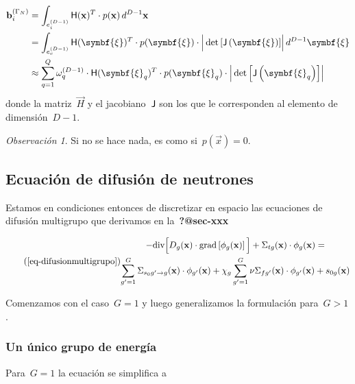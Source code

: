 \documentclass[
  12pt,
  a4paper,
  table]{scrbook}
\theoremstyle{plain}
\theoremstyle{definition}
\theoremstyle{plain}
\theoremstyle{plain}
\theoremstyle{remark}
\newtheorem*{remark}{Observación}
\begin{document}
\[
\begin{aligned}
\vec{b}_i^{(\Gamma_N)} &= \int_{e_i^{(D-1)}} \mat{H}(\vec{x})^T \cdot p(\vec{x}) \, d^{D-1}\vec{x} \\
&= \int_{e_c^{(D-1)}} \mat{H}(\symbf{\xi})^T \cdot p(\symbf{\xi}) \cdot \Big|\det{\left[\mat{J}\left(\symbf{\xi}\right)\right]}\Big| \, d^{D-1}\symbf{\xi} \\
&\approx
\sum_{q=1}^Q \omega_q^{(D-1)} \cdot \mat{H}(\symbf{\xi}_q)^T \cdot p(\symbf{\xi}_q) \cdot \Big|\det{\left[\mat{J}\left(\symbf{\xi}_q\right)\right]}\Big| 
\end{aligned}
\] donde la matriz~\(\vec{H}\) y el jacobiano~\(\mathsf{J}\) son los que le
corresponden al elemento de dimensión~\(D-1\).

\begin{remark}

Si no se hace nada, es como si~\(p(\vec{x})=0\).

\end{remark}

\hypertarget{sec-difusion-multigrupo-fem}{%
\subsection{Ecuación de difusión de
neutrones}\label{sec-difusion-multigrupo-fem}}

Estamos en condiciones entonces de discretizar en espacio las ecuaciones
de difusión multigrupo que derivamos en la~\textbf{?@sec-xxx}

\[ \tag{\ref{eq-difusionmultigrupo}}
\begin{gathered}
 - \text{div} \Big[ D_g(\vec{x}) \cdot \text{grad} \left[ \phi_g(\vec{x}) \right] \Big]
 + \Sigma_{t g}(\vec{x}) \cdot \phi_g(\vec{x})
 = \\
\sum_{g^\prime = 1}^G \Sigma_{s_0 g^\prime \rightarrow g}(\vec{x})  \cdot \phi_{g^\prime}(\vec{x}) +
\chi_g \sum_{g^\prime = 1}^G \nu\Sigma_{fg^\prime}(\vec{x}) \cdot \phi_{g^\prime}(\vec{x})+ s_{0g}(\vec{x})
\end{gathered}
\]

Comenzamos con el caso~\(G=1\) y luego generalizamos la formulación
para~\(G>1\).

\hypertarget{un-uxfanico-grupo-de-energuxeda}{%
\subsubsection{Un único grupo de
energía}\label{un-uxfanico-grupo-de-energuxeda}}

Para~\(G=1\) la ecuación se simplifica a
\end{document}

